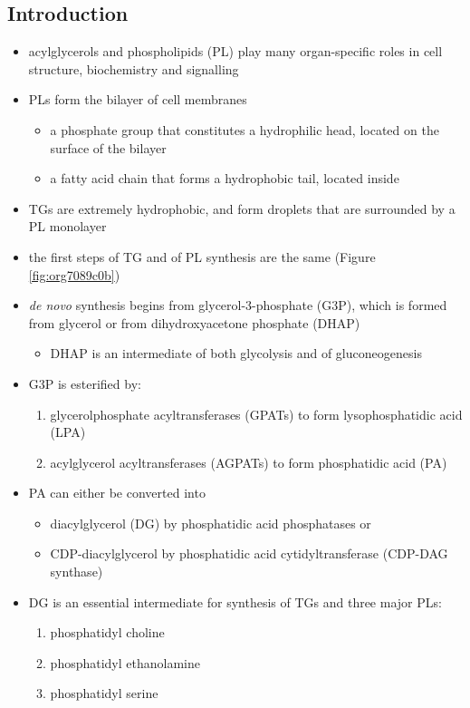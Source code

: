 \documentclass[12pt]{scrartcl}
\begin{document}
\subsection{Introduction}
\label{sec:org3eb1319}
\begin{itemize}
\item acylglycerols and phospholipids (PL) play many organ-specific roles
in cell structure, biochemistry and signalling
\item PLs form the bilayer of cell membranes
\begin{itemize}
\item a phosphate group that constitutes a hydrophilic head, located on the surface of the bilayer
\item a fatty acid chain that forms a hydrophobic tail, located inside
\end{itemize}
\item TGs are extremely hydrophobic, and form droplets
that are surrounded by a PL monolayer
\item the first steps of TG and of PL synthesis are the same (Figure \ref{fig:org7089c0b})
\item \emph{de novo} synthesis begins from glycerol-3-phosphate (G3P), which is
formed from glycerol or from dihydroxyacetone phosphate (DHAP)
\begin{itemize}
\item DHAP is an intermediate of both glycolysis and of gluconeogenesis
\end{itemize}
\item G3P is esterified by:
\begin{enumerate}
\item glycerolphosphate acyltransferases (GPATs) to form lysophosphatidic acid (LPA)
\item acylglycerol acyltransferases (AGPATs) to form phosphatidic acid (PA)
\end{enumerate}
\item PA can either be converted into
\begin{itemize}
\item diacylglycerol (DG) by phosphatidic acid phosphatases or
\item CDP-diacylglycerol by phosphatidic acid cytidyltransferase (CDP-DAG synthase)
\end{itemize}
\item DG is an essential intermediate for synthesis of TGs and three major PLs:
\begin{enumerate}
\item phosphatidyl choline
\item phosphatidyl ethanolamine
\item phosphatidyl serine
\end{enumerate}
\end{itemize}
\end{document}
